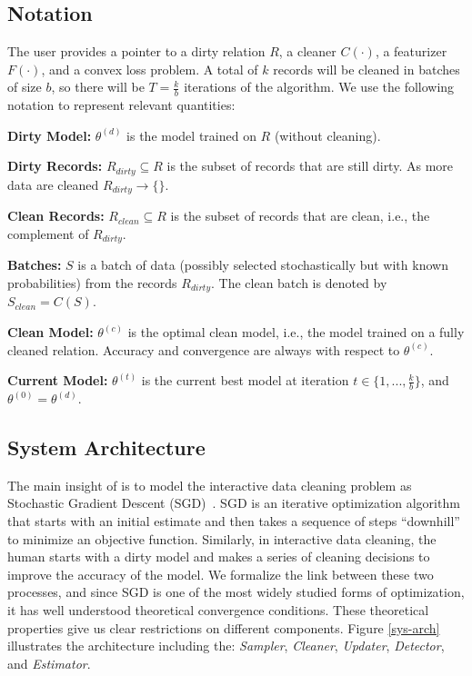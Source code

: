 \subsection{Notation}\label{notation}
The user provides a pointer to a dirty relation $R$, a cleaner $C(\cdot)$, a featurizer $F(\cdot)$, and a convex loss problem.
A total of $k$ records will be cleaned in batches of size $b$, so there will be $T = \frac{k}{b}$ iterations of the algorithm.  
We use the following notation to represent relevant quantities:

\vspace{0.25em}

\noindent\textbf{Dirty Model: } $\theta^{(d)}$ is the model trained on $R$ (without cleaning). 

\vspace{0.25em}

\noindent\textbf{Dirty Records: } $R_{dirty} \subseteq R$ is the subset of records that are still dirty. As more data are cleaned $R_{dirty} \rightarrow \{\}$.

\vspace{0.25em}

\noindent\textbf{Clean Records: } $R_{clean} \subseteq R$ is the subset of records that are clean, i.e., the complement of $R_{dirty}$.

\vspace{0.25em}

\noindent\textbf{Batches: } $S$ is a batch of data (possibly selected stochastically but with known probabilities) from the records $R_{dirty}$. The clean batch is denoted by $S_{clean} = C(S)$.

\vspace{0.25em}

\noindent\textbf{Clean Model: } $\theta^{(c)}$ is the optimal clean model, i.e., the model trained on a fully cleaned relation. Accuracy and convergence are always with respect to $\theta^{(c)}$.

\noindent\textbf{Current Model: } $\theta^{(t)}$ is the current best model at iteration $t \in \{1,...,\frac{k}{b}\}$, and $\theta^{(0)} = \theta^{(d)}$. 


\subsection{System Architecture}\label{syarch}
The main insight of \sys is to model the interactive data cleaning problem as Stochastic Gradient Descent (SGD)~\cite{bottou2012stochastic}.
SGD is an iterative optimization algorithm that starts with an initial estimate and then takes a sequence of steps ``downhill'' to minimize an objective function.
Similarly, in interactive data cleaning, the human starts with a dirty model and makes a series of cleaning decisions to improve the accuracy of the model.
We formalize the link between these two processes, and since SGD is one of the most widely studied forms of optimization, it has well understood theoretical convergence conditions.
These theoretical properties give us clear restrictions on different components.
Figure \ref{sys-arch} illustrates the \sys architecture including the: {\it Sampler}, {\it Cleaner}, \emph{Updater}, {\it Detector}, and {\it Estimator}.

